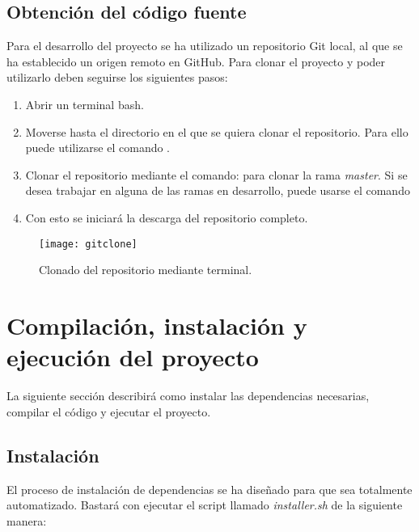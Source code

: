 \subsection{Obtención del código fuente}

Para el desarrollo del proyecto se ha utilizado un repositorio Git local, al que se ha establecido un origen remoto en GitHub. Para clonar el proyecto y poder utilizarlo deben seguirse los siguientes pasos:

\begin{enumerate}
\item Abrir un terminal bash. 
\item Moverse hasta el directorio en el que se quiera clonar el repositorio. Para ello puede utilizarse el comando .
\item Clonar el repositorio mediante el comando:  para clonar la rama \emph{master}. Si se desea trabajar en alguna de las ramas en desarrollo, puede usarse el comando 
\item Con esto se iniciará la descarga del repositorio completo.
\end{enumerate}

\begin{figure}[H]
	\centering
	\texttt{[image: gitclone]}
	\caption[Clonado de repositorio Git]{Clonado del repositorio mediante terminal.}\label{fig:gitclone}
\end{figure}

\section{Compilación, instalación y ejecución del proyecto}
La siguiente sección describirá como instalar las dependencias necesarias, compilar el código y ejecutar el proyecto.

\subsection{Instalación}
\label{subsec:installersh}

El proceso de instalación de dependencias se ha diseñado para que sea totalmente automatizado. 
Bastará con ejecutar el script llamado \emph{installer.sh} de la siguiente manera: 

